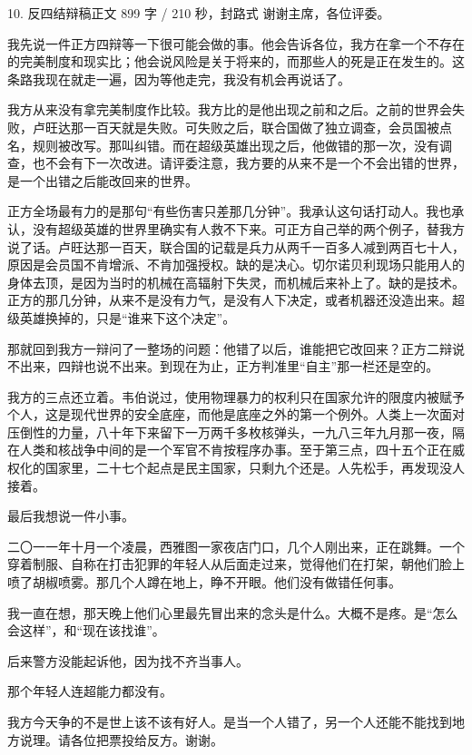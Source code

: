 \documentclass[script,con]{debate}
\begin{document}
\begin{speech}{10. 反四结辩稿}{正文 899 字 / 210 秒，封路式}
谢谢主席，各位评委。

我先说一件正方四辩等一下很可能会做的事。他会告诉各位，我方在拿一个不存在的完美制度和现实比；他会说风险是关于将来的，而那些人的死是正在发生的。这条路我现在就走一遍，因为等他走完，我没有机会再说话了。

我方从来没有拿完美制度作比较。我方比的是他出现之前和之后。之前的世界会失败，卢旺达那一百天就是失败。可失败之后，联合国做了独立调查，会员国被点名，规则被改写。那叫纠错。而在超级英雄出现之后，他做错的那一次，没有调查，也不会有下一次改进。请评委注意，我方要的从来不是一个不会出错的世界，是一个出错之后能改回来的世界。

正方全场最有力的是那句“有些伤害只差那几分钟”。我承认这句话打动人。我也承认，没有超级英雄的世界里确实有人救不下来。可正方自己举的两个例子，替我方说了话。卢旺达那一百天，联合国的记载是兵力从两千一百多人减到两百七十人，原因是会员国不肯增派、不肯加强授权。缺的是决心。切尔诺贝利现场只能用人的身体去顶，是因为当时的机械在高辐射下失灵，而机械后来补上了。缺的是技术。正方的那几分钟，从来不是没有力气，是没有人下决定，或者机器还没造出来。超级英雄换掉的，只是“谁来下这个决定”。

那就回到我方一辩问了一整场的问题：他错了以后，谁能把它改回来？正方二辩说不出来，四辩也说不出来。到现在为止，正方判准里“自主”那一栏还是空的。

我方的三点还立着。韦伯说过，使用物理暴力的权利只在国家允许的限度内被赋予个人，这是现代世界的安全底座，而他是底座之外的第一个例外。人类上一次面对压倒性的力量，八十年下来留下一万两千多枚核弹头，一九八三年九月那一夜，隔在人类和核战争中间的是一个军官不肯按程序办事。至于第三点，四十五个正在威权化的国家里，二十七个起点是民主国家，只剩九个还是。人先松手，再发现没人接着。

最后我想说一件小事。

二〇一一年十月一个凌晨，西雅图一家夜店门口，几个人刚出来，正在跳舞。一个穿着制服、自称在打击犯罪的年轻人从后面走过来，觉得他们在打架，朝他们脸上喷了胡椒喷雾。那几个人蹲在地上，睁不开眼。他们没有做错任何事。

我一直在想，那天晚上他们心里最先冒出来的念头是什么。大概不是疼。是“怎么会这样”，和“现在该找谁”。

后来警方没能起诉他，因为找不齐当事人。

那个年轻人连超能力都没有。

我方今天争的不是世上该不该有好人。是当一个人错了，另一个人还能不能找到地方说理。请各位把票投给反方。谢谢。

\begin{contingency}
\end{contingency}
\end{speech}
\end{document}
